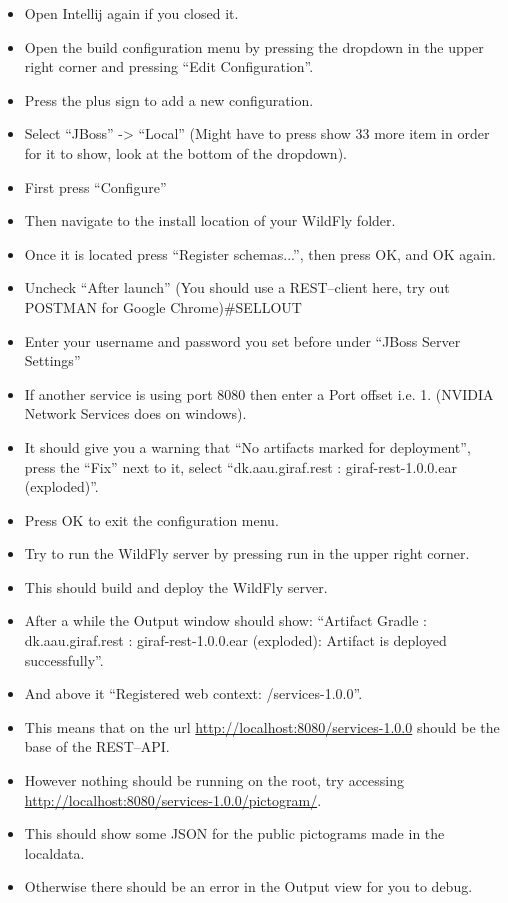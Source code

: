 \begin{itemize}
    \item Open Intellij again if you closed it.
    \item Open the build configuration menu by pressing the dropdown in the upper right corner and pressing ``Edit Configuration''.
    \item Press the plus sign to add a new configuration.
    \item Select ``JBoss'' -> ``Local'' (Might have to press show 33 more item in order for it to show, look at the bottom of the dropdown).
    \item First press ``Configure''
    \item Then navigate to the install location of your WildFly folder.
    \item Once it is located press ``Register schemas...'', then press OK, and OK again.
    \item Uncheck ``After launch'' (You should use a REST--client here, try out POSTMAN for Google Chrome)\#SELLOUT
    \item Enter your username and password you set before under ``JBoss Server Settings''
    \item If another service is using port 8080 then enter a Port offset i.e. 1. (NVIDIA Network Services does on windows).
    \item It should give you a warning that ``No artifacts marked for deployment'', press the ``Fix'' next to it, select ``dk.aau.giraf.rest :
giraf-rest-1.0.0.ear (exploded)''.
    \item Press OK to exit the configuration menu.
    \item Try to run the WildFly server by pressing run in the upper right corner.
    \item This should build and deploy the WildFly server.
    \item After a while the Output window should show: ``Artifact Gradle : dk.aau.giraf.rest : giraf-rest-1.0.0.ear (exploded): Artifact is deployed
successfully''.
    \item And above it ``Registered web context: /services-1.0.0''.
    \item This means that on the url \url{http://localhost:8080/services-1.0.0} should be the base of the REST--API.
    \item However nothing should be running on the root, try accessing \url{http://localhost:8080/services-1.0.0/pictogram/}.
    \item This should show some JSON for the public pictograms made in the localdata.
    \item Otherwise there should be an error in the Output view for you to debug.
\end{itemize}

